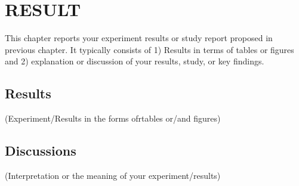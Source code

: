 \chapter{RESULT}
This chapter reports your experiment results or study report proposed in previous chapter. It typically consists of 1) Results in terms of tables or figures and 2) explanation or discussion of your results, study, or key findings.

\section{Results}
\noindent\hspace{2.5em}(Experiment/Results in the forms ofrtables or/and figures)

\section{Discussions}
\noindent\hspace{2.5em}(Interpretation or the meaning of your experiment/results)

